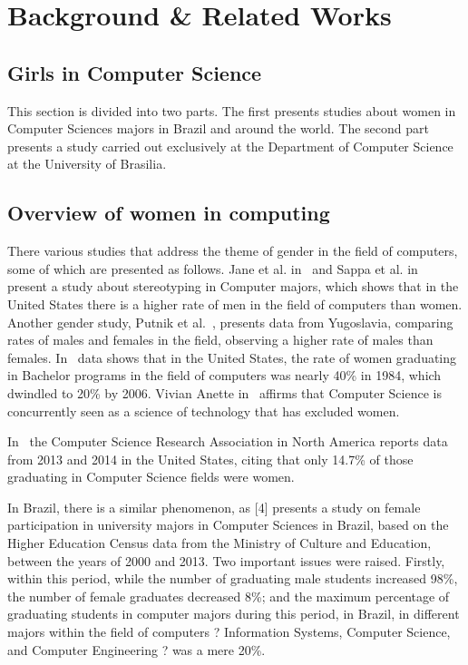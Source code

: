 \section{Background \& Related Works}\label{sec:background}%

\subsection{Girls in Computer Science}\label{subsec:background:girls}%
This section is divided into two parts. The first presents studies about women in Computer Sciences majors in Brazil and around the world. The second part presents a study carried out exclusively at the Department of Computer Science at the University of Brasilia.

\subsection{Overview of women in computing }
There various studies that address the theme of gender in the field of computers, some of which are presented as follows.
Jane et al. in~\cite{jane_2016} and Sappa et al. in~\cite{sappa_2013} present a study about stereotyping in Computer majors, which shows that in the United States there is a higher rate of men in the field of computers than women. Another gender study, Putnik et al.~\cite{zoran_2017}, presents data from Yugoslavia, comparing rates of males and females in the field, observing a higher rate of males than females. In~\cite{keinan_2017,moshe_2015} data shows that in the United States, the rate of women graduating in Bachelor programs in the field of computers was nearly 40\% in 1984, which dwindled to 20\% by 2006. Vivian Anette in~\cite{vivian_2007} affirms that Computer Science is concurrently seen as a science of technology that has excluded women.

In~\cite{moshe_2015}  the Computer Science Research Association in North America reports data from 2013 and 2014 in the United States, citing that only 14.7\% of those graduating in Computer Science fields were women.

In Brazil, there is a similar phenomenon, as [4] presents a study on female participation in university majors in Computer Sciences in Brazil, based on the Higher Education Census data from the Ministry of Culture and Education, between the years of 2000 and 2013. Two important issues were raised. Firstly, within this period, while the number of graduating male students increased 98\%, the number of female graduates decreased 8\%; and the maximum percentage of graduating students in computer majors during this period, in Brazil, in different majors within the field of computers ? Information Systems, Computer Science, and Computer Engineering ? was a mere 20\%.


